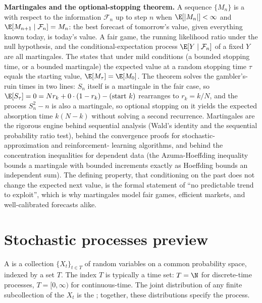 \begin{mastery}
\textbf{Martingales and the optional-stopping theorem.} A sequence
$\{M_{n}\}$ is a  with respect to the information
$\mathcal{F}_{n}$ up to step $n$ when $\E[|M_{n}|] < \infty$ and
$\E[M_{n+1} \mid \mathcal{F}_{n}] = M_{n}$: the best forecast of
tomorrow's value, given everything known today, is today's value. A
fair game, the running likelihood ratio under the null hypothesis, and
the conditional-expectation process $\E[Y \mid \mathcal{F}_{n}]$ of a
fixed $Y$ are all martingales. The 
states that under mild conditions (a bounded stopping time, or a bounded
martingale) the expected value at a random stopping time $\tau$ equals
the starting value, $\E[M_{\tau}] = \E[M_{0}]$. The theorem solves the
gambler's-ruin times in two lines: $S_{n}$ itself is a martingale in the
fair case, so $\E[S_{\tau}] = 0 = N r_{k} + 0 \cdot (1 - r_{k}) -
\text{(start } k)$ rearranges to $r_{k} = k/N$, and the process $S_{n}^{2}
- n$ is also a martingale, so optional stopping on it yields the
expected absorption time $k(N - k)$ without solving a second recurrence.
Martingales are the rigorous engine behind sequential analysis (Wald's
identity and the sequential probability ratio test), behind the
convergence proofs for stochastic-approximation and reinforcement-
learning algorithms, and behind the concentration inequalities for
dependent data (the Azuma-Hoeffding inequality bounds a martingale with
bounded increments exactly as Hoeffding bounds an independent sum). The
defining property, that conditioning on the past does not change the
expected next value, is the formal statement of ``no predictable trend
to exploit'', which is why martingales model fair games, efficient
markets, and well-calibrated forecasts alike.
\end{mastery}

\section{Stochastic processes preview}\label{sec:vol02:ch13:processes}

A  is a collection $\{X_{t}\}_{t \in T}$
of random variables on a common probability space, indexed by a set
$T$. The index $T$ is typically a time set: $T = \N$ for
discrete-time processes, $T = [0, \infty)$ for continuous-time. The
joint distribution of any finite subcollection of the $X_{t}$ is
the ; together, these
distributions specify the process.

